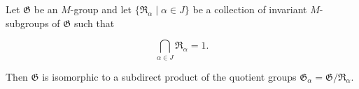 Let $\mathfrak{G}$ be an $M$-group and let $\{\mathfrak{R}_{\alpha} \mid \alpha \in J\}$ be a collection of invariant $M$-subgroups of $\mathfrak{G}$ such that

$$\bigcap_{\alpha \in J} \mathfrak{R}_{\alpha} = 1.$$

Then $\mathfrak{G}$ is isomorphic to a subdirect product of the quotient groups $\mathfrak{G}_{\alpha} = \mathfrak{G} / \mathfrak{R}_{\alpha}$.
